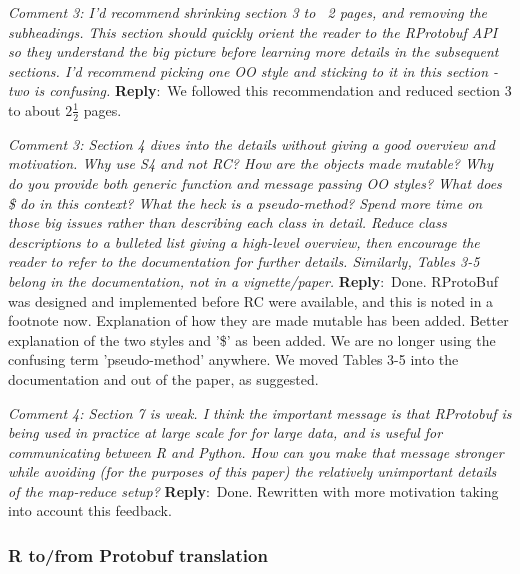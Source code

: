 \documentclass[10pt]{article}
\newcommand{\pointRaised}[2]{\smallskip %
  \textsl{{\fontseries{b}\selectfont #1}: #2}\newline}
\newcommand{\reply}[1]{\textbf{Reply}:\ #1 \smallskip } %
\begin{document}
\pointRaised{Comment 3}{I'd recommend shrinking section 3 to ~2 pages, and removing the
  subheadings. This section should quickly orient the reader to the
  RProtobuf API so they understand the big picture before learning more
  details in the subsequent sections. I'd recommend picking one OO style
  and sticking to it in this section - two is confusing.}
\reply{We followed this recommendation and reduced section 3 to about $2\frac{1}{2}$ pages.}

\pointRaised{Comment 3}{Section 4 dives into the details without giving a good overview and
  motivation. Why use S4 and not RC? How are the objects made mutable?
  Why do you provide both generic function and message passing OO
  styles? What does \$ do in this context? What the heck is a
  pseudo-method? Spend more time on those big issues rather than
  describing each class in detail. Reduce class descriptions to a
  bulleted list giving a high-level overview, then encourage the reader
  to refer to the documentation for further details. Similarly, Tables
  3-5 belong in the documentation, not in a vignette/paper.}
\reply{Done. RProtoBuf was designed and implemented before RC were
  available, and this is noted in a footnote now.  Explanation of how
  they are made mutable has been added.  Better explanation of the
  two styles and '\$' as been added.  We are no longer using the
  confusing term
  'pseudo-method' anywhere.  We moved Tables 3-5 into the documentation
  and out of the paper, as suggested.}

\pointRaised{Comment 4}{Section 7 is weak. I think the important message is that RProtobuf is
  being used in practice at large scale for for large data, and is
  useful for communicating between R and Python. How can you make that
  message stronger while avoiding (for the purposes of this paper) the
  relatively unimportant details of the map-reduce setup?}
\reply{Done.  Rewritten with more motivation taking into account this feedback.}

\subsubsection*{R to/from Protobuf translation}
\end{document}
